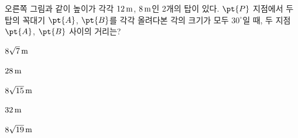 \noindent\begin{minipage}[t]{0.58\linewidth}\vspace{0pt}\raggedright 오른쪽 그림과 같이 높이가 각각 $12\mkern3mu \mathrm{m}$, $8\mkern3mu \mathrm{m}$인 2개의 탑이 있다. $\pt{P}$ 지점에서 두 탑의 꼭대기 $\pt{A}$, $\pt{B}$를 각각 올려다본 각의 크기가 모두 $30^\circ$일 때, 두 지점~$\pt{A}$, $\pt{B}$ 사이의 거리는?\end{minipage}\hfill\begin{minipage}[t]{0.4\linewidth}\vspace{0pt}\centering \resizebox{\ifdim\width>\linewidth\linewidth\else\width\fi}{!}{}\end{minipage}\par
\begin{choices32}{\rule[-3ex]{0pt}{8ex}$8\sqrt{7}\mkern3mu \mathrm{m}$}{\rule[-3ex]{0pt}{8ex}$28\mkern3mu \mathrm{m}$}{\rule[-3ex]{0pt}{8ex}$8\sqrt{15}\mkern3mu \mathrm{m}$}{\rule[-3ex]{0pt}{8ex}$32\mkern3mu \mathrm{m}$}{\rule[-3ex]{0pt}{8ex}$8\sqrt{19}\mkern3mu \mathrm{m}$}\end{choices32}
